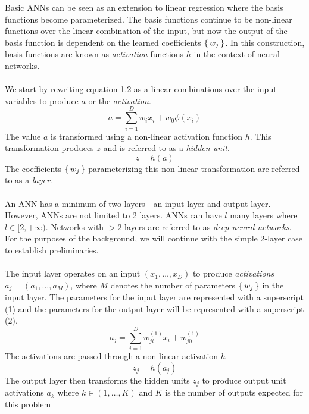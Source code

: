 Basic ANNs can be seen as an extension to linear regression where the basis functions become 
parameterized. The basis functions continue to be non-linear functions over the linear 
combination of the input, but now the output of the basis function is dependent on the 
learned coefficients $\set{w_j}$. In this construction, basis functions are known as 
\textit{activation} functions $h$ in the context of neural networks. 
\\\\
We start by rewriting equation 1.2 as a linear combinations over the input variables to 
produce $a$ or the \textit{activation}. 
\begin{equation}
    a = \sum_{i=1}^{D} w_{i}x_i + w_{0} \phi\left(x_i\right)
\end{equation}
The value $a$  is transformed using a non-linear activation function $h$. This 
transformation produces $z$ and is referred to as a \textit{hidden unit}. 
\begin{equation}
    z = h\left(a\right)
\end{equation}
The coefficients $\set{w_j}$ parameterizing this non-linear transformation
are referred to as a \textit{layer}.
\\\\
An ANN has a minimum of two layers - an input layer and output layer. 
However, ANNs are not limited to 2 layers.
ANNs can have $l$ many layers where $l \in [2, +\infty)$. 
Networks with $>2$ layers are referred to as \textit{deep neural networks}.
For the purposes of the background, we will continue with the simple 2-layer case to
establish preliminaries.
\\\\
The input layer operates on an input $(x_1, \ldots, x_D)$ to produce \textit{activations}
$a_j = (a_1, \ldots, a_M)$, where $M$ denotes the number of parameters $\set{w_j}$ in the 
input layer. 
The parameters for the input layer are represented with a superscript (1) and the parameters 
for the output layer will be represented with a superscript (2).
\begin{equation}
    a_j = \sum_{i=1}^{D} w_{ji}^{(1)}x_i + w_{j0}^{(1)}
\end{equation}
The activations are passed through a non-linear activation $h$
\begin{equation}
    z_j = h\left(a_{j}\right)
\end{equation}
The output layer then transforms the hidden units $z_j$ to produce output unit activations 
$a_k$ where $k \in (1, \ldots, K)$ and $K$ is the number of outputs expected for this problem

